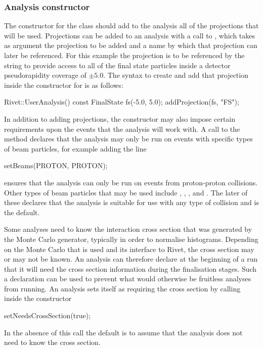 \documentclass{JHEP3}
\begin{document}
\subsubsection{Analysis constructor}
The constructor for the  class should add to the analysis all
of the projections that will be used.  Projections can be added to an analysis
with a call to , which takes as
argument the projection to be added and a name by which that projection can
later be referenced.  For this example the  projection is to be
referenced by the string  to provide access to all of the final state
particles inside a detector pseudorapidity coverage of $\pm 5.0$.  The syntax to
create and add that projection inside the constructor for  is
as follows:
%
\begin{snippet}
Rivet::UserAnalysis() {
  const FinalState fs(-5.0, 5.0);
  addProjection(fs, "FS");
}
\end{snippet}

In addition to adding projections, the constructor may also impose certain
requirements upon the events that the analysis will work with.  A call to the
 method declares that the analysis may only be run on events with
specific types of beam particles, for example adding the line
%
\begin{snippet}
  setBeams(PROTON, PROTON);
\end{snippet}
%
\noindent ensures that the analysis can only be run on events from proton-proton
collisions.  Other types of beam particles that may be used include
, , ,  and .
The later of these declares that the analysis is suitable for use with any type
of collision and is the default.

Some analyses need to know the interaction cross section that was generated by
the Monte Carlo generator, typically in order to normalise histograms.
Depending on the Monte Carlo that is used and its interface to Rivet, the cross
section may or may not be known.  An analysis can therefore declare at the
beginning of a run that it will need the cross section information during the
finalisation stages.  Such a declaration can be used to prevent what would
otherwise be fruitless analyses from running.  An analysis sets itself as
requiring the cross section by calling inside the constructor
%
\begin{snippet}
  setNeedsCrossSection(true);
\end{snippet}
%
\noindent In the absence of this call the default is to assume that the analysis
does not need to know the cross section.
\end{document}
